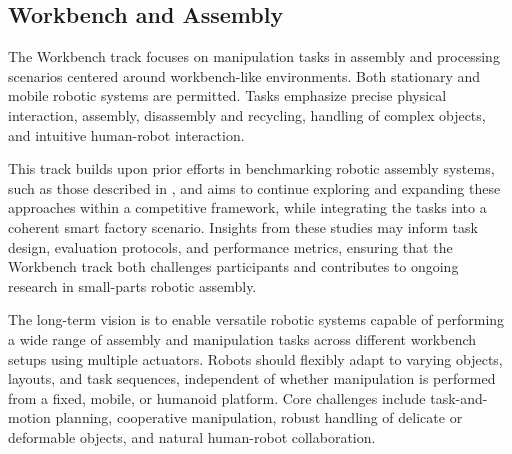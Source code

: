 \documentclass[letterpaper, 11pt]{extarticle}
\begin{document}




\subsection{Workbench and Assembly} %

The Workbench track focuses on manipulation tasks in assembly and processing scenarios centered around workbench-like environments. Both stationary and mobile robotic systems are permitted. Tasks emphasize precise physical interaction, assembly, disassembly and recycling, handling of complex objects, and intuitive human-robot interaction.

This track builds upon prior efforts in benchmarking robotic assembly systems, such as those described in \cite{assembly20}, and aims to continue exploring and expanding these approaches within a competitive framework, while integrating the tasks into a coherent smart factory scenario.
Insights from these studies may inform task design, evaluation protocols, and performance metrics, ensuring that the Workbench track both challenges participants and contributes to ongoing research in small-parts robotic assembly.

The long-term vision is to enable versatile robotic systems capable of performing a wide range of assembly and manipulation tasks across different workbench setups using multiple actuators. Robots should flexibly adapt to varying objects, layouts, and task sequences, independent of whether manipulation is performed from a fixed, mobile, or humanoid platform. Core challenges include task-and-motion planning, cooperative manipulation, robust handling of delicate or deformable objects, and natural human-robot collaboration.
\end{document}
